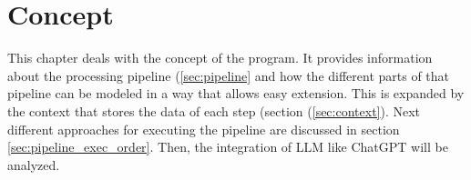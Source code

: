\begingroup
\renewcommand{\cleardoublepage}{} %
\renewcommand{\clearpage}{}
\chapter{Concept}\label{chapter:conception}
\endgroup
This chapter deals with the concept of the program. It provides information about the processing pipeline (\ref{sec:pipeline} and how the different parts of that pipeline can be modeled in a way that allows easy extension. This is expanded by the context that stores the data of each step (section (\ref{sec:context}). Next different approaches for executing the pipeline are discussed in section \ref{sec:pipeline_exec_order}. Then, the integration of \ac{LLM} like ChatGPT will be analyzed. 




